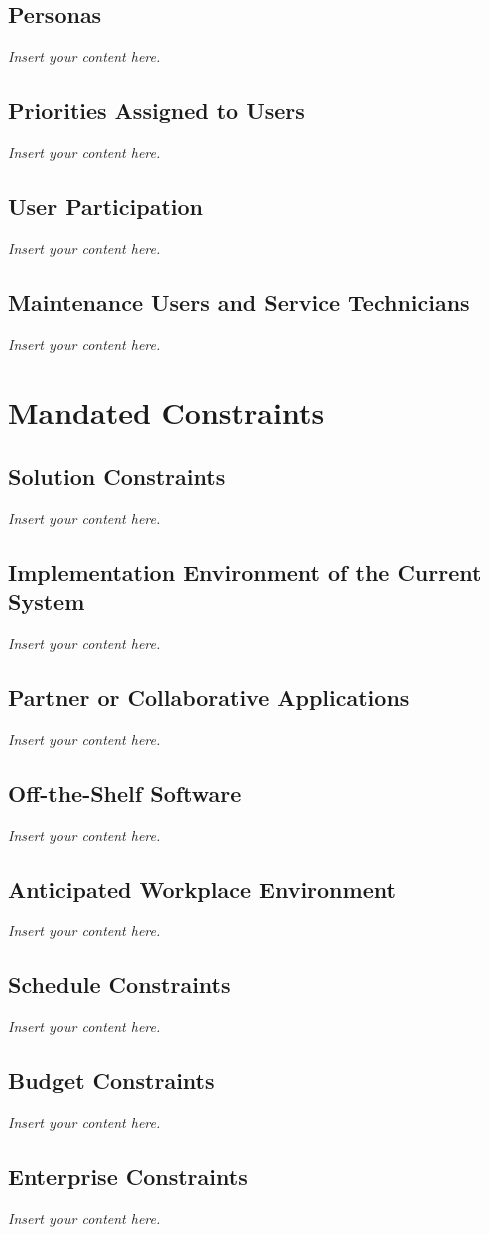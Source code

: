 \documentclass[12pt]{article}
\newcommand{\lips}{\textit{Insert your content here.}}
\begin{document}
\subsection{Personas}
\lips
\subsection{Priorities Assigned to Users}
\lips
\subsection{User Participation}
\lips
\subsection{Maintenance Users and Service Technicians}
\lips

\section{Mandated Constraints}
\subsection{Solution Constraints}
\lips
\subsection{Implementation Environment of the Current System}
\lips
\subsection{Partner or Collaborative Applications}
\lips
\subsection{Off-the-Shelf Software}
\lips
\subsection{Anticipated Workplace Environment}
\lips
\subsection{Schedule Constraints}
\lips
\subsection{Budget Constraints}
\lips
\subsection{Enterprise Constraints}
\lips
\end{document}
